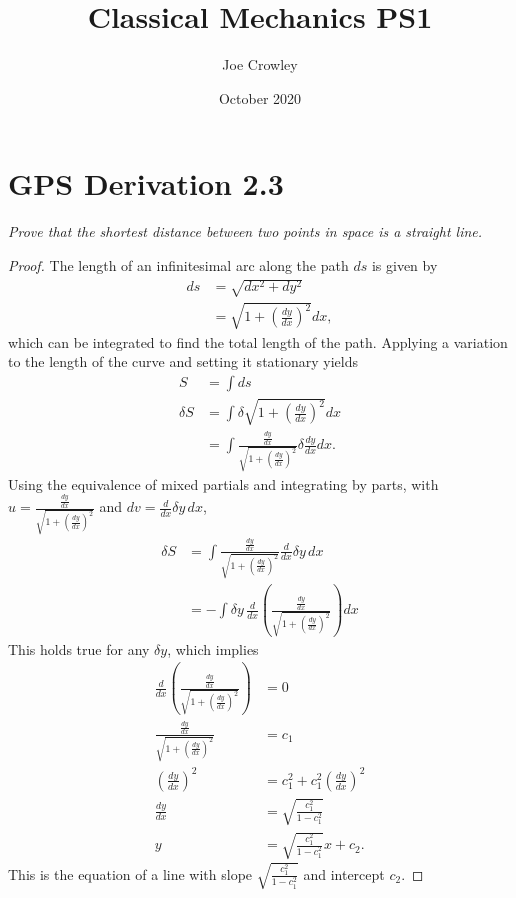 \documentclass{article}
\title{Classical Mechanics PS1}
\author{Joe Crowley}
\date{October 2020}
\begin{document}
  

\section{GPS Derivation 2.3}
\textit{Prove that the shortest distance between two points in space is a straight line.}
\begin{proof}
    The length of an infinitesimal arc along the path $ds$ is given by 
    \begin{align*}
        ds &= \sqrt{dx^2 + dy^2} \\ 
        &= \sqrt{1+ \left( \frac{dy}{dx}\right)^2 }dx,
    \end{align*}
    which can be integrated to find the total length of the path. Applying a variation to the length of the curve and setting it stationary yields 
    \begin{align*}
        S &= \int{ds}\\
        \delta S &= \int{\delta \sqrt{1+ \left( \frac{dy}{dx}\right)^2 }dx}\\
        &= \int{\frac{\frac{dy}{dx}} {\sqrt{1+ \left( \frac{dy}{dx}\right)^2 }} \delta \frac{dy}{dx}dx}.
    \end{align*}
    Using the equivalence of mixed partials and integrating by parts, with $u = \frac{\frac{dy}{dx}} {\sqrt{1+ \left( \frac{dy}{dx}\right)^2 }}$ and $dv = \frac{d}{dx}\delta y \,dx$, 
    \begin{align*}
        \delta S&= \int{\frac{\frac{dy}{dx}} {\sqrt{1+ \left( \frac{dy}{dx}\right)^2 }} \frac{d}{dx}\delta y \,dx}\\
        &=-\int{\delta y \,\frac{d}{dx}\left( \frac{\frac{dy}{dx}} {\sqrt{1+ \left( \frac{dy}{dx}\right)^2 }}\right) dx}
    \end{align*}
    This holds true for any $\delta y$, which implies
    \begin{align*}
        \frac{d}{dx}\left( \frac{\frac{dy}{dx}} {\sqrt{1+ \left( \frac{dy}{dx}\right)^2 }}\right) & = 0\\
        \frac{\frac{dy}{dx}} {\sqrt{1+ \left( \frac{dy}{dx}\right)^2 }} &= c_1\\
        \left(\frac{d y}{d x}\right)^{2} &= c_{1}^{2}+c_{1}^{2}\left(\frac{d y}{d x}\right)^{2}\\
        \frac{d y}{d x}&=\sqrt{\frac{c_{1}^{2}}{1-c_{1}^{2}}}\\
        y&=\sqrt{\frac{c_{1}^{2}}{1-c_{1}^{2}}} x+c_{2}.
    \end{align*}
        This is the equation of a line with slope $\sqrt{\frac{c_{1}^{2}}{1-c_{1}^{2}}}$ and intercept $c_2$.
\end{proof}
\newpage 
\end{document}
